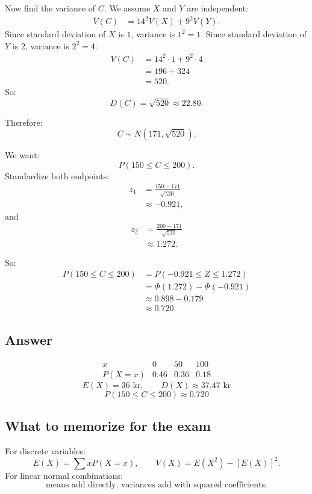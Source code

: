 \documentclass[11pt,a4paper]{article}
\begin{document}
Now find the variance of \(C\). We assume \(X\) and \(Y\) are independent:
\begin{align*}
V(C)
&=14^2V(X)+9^2V(Y).
\end{align*}
Since standard deviation of \(X\) is \(1\), variance is \(1^2=1\). Since standard deviation of \(Y\) is \(2\), variance is \(2^2=4\):
\begin{align*}
V(C)
&=14^2\cdot 1+9^2\cdot 4\\
&=196+324\\
&=520.
\end{align*}
So:
\[
D(C)=\sqrt{520}\approx 22.80.
\]

Therefore:
\[
C\sim N(171,\sqrt{520}).
\]

We want:
\[
P(150\le C\le 200).
\]
Standardize both endpoints:
\begin{align*}
z_1
&=\frac{150-171}{\sqrt{520}}\\
&\approx -0.921,
\end{align*}
and
\begin{align*}
z_2
&=\frac{200-171}{\sqrt{520}}\\
&\approx 1.272.
\end{align*}

So:
\begin{align*}
P(150\le C\le 200)
&=P(-0.921\le Z\le 1.272)\\
&=\Phi(1.272)-\Phi(-0.921)\\
&\approx 0.898-0.179\\
&\approx 0.720.
\end{align*}

\subsection*{Answer}
\[
\boxed{
\begin{array}{c|ccc}
x & 0 & 50 & 100\\ \hline
P(X=x) & 0.46 & 0.36 & 0.18
\end{array}}
\]
\[
\boxed{E(X)=36\text{ kr}},\qquad
\boxed{D(X)\approx 37.47\text{ kr}}
\]
\[
\boxed{P(150\le C\le 200)\approx 0.720}
\]

\subsection*{What to memorize for the exam}
For discrete variables:
\[
E(X)=\sum xP(X=x),\qquad V(X)=E(X^2)-[E(X)]^2.
\]
For linear normal combinations:
\[
\text{means add directly, variances add with squared coefficients.}
\]
\end{document}
